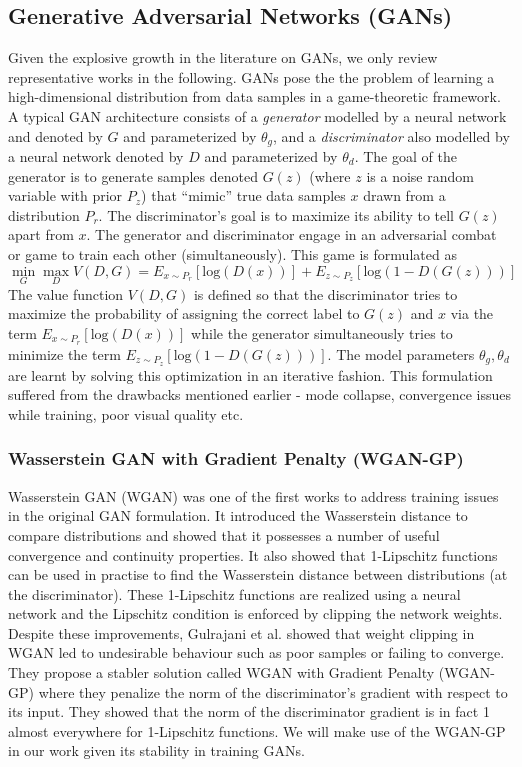 \documentclass{article}
\begin{document}
\subsection{Generative Adversarial Networks (GANs)}
\label{ssec:gans}
Given the explosive growth in the literature on GANs, we only review representative works in the following. GANs \cite{goodfellow2014generative} pose the the problem of learning a high-dimensional distribution from data samples in a game-theoretic framework. A typical GAN architecture consists of a {\em{generator}} modelled by a neural network and denoted by $G$ and parameterized by $\theta_g$, and a {\em{discriminator}} also modelled by a neural network denoted by $D$ and parameterized by $\theta_d$. The goal of the generator is to generate samples denoted $G(z)$ (where $z$ is a noise random variable with prior $P_z$) that ``mimic'' true data samples $x$ drawn from a distribution $P_r$. The discriminator's goal is to maximize its ability to tell $G(z)$ apart from $x$. The generator and discriminator engage in an adversarial combat or game to train each other (simultaneously). This game is formulated as
\begin{equation}
\min_{G}\max_{D} V(D,G) = E_{x\sim P_r}[\text{log}(D(x))] 
+ E_{z\sim P_{z}}[\text{log}(1-D(G(z)))]
\label{eqn:game}
\end{equation}
The value function $V(D, G)$ is defined so that the discriminator tries to maximize the probability of assigning the correct label to $G(z)$ and $x$ via the term $E_{x\sim P_r}[\text{log}(D(x))] $ while the generator simultaneously tries to minimize the term $E_{z\sim P_{z}}[\text{log}(1-D(G(z)))]$. The model parameters $\theta_g, \theta_d$ are learnt by solving this optimization in an iterative fashion. This formulation suffered from the drawbacks mentioned earlier - mode collapse, convergence issues while training, poor visual quality etc.

\subsubsection{Wasserstein GAN with Gradient Penalty (WGAN-GP)}
\label{sssec:wgan_gp}
Wasserstein GAN (WGAN) \cite{arjovsky2017wasserstein} was one of the first works to address training issues in the original GAN formulation. It introduced the Wasserstein distance to compare distributions and showed that it possesses a number of useful convergence and continuity properties. It also showed that 1-Lipschitz functions can be used in practise to find the Wasserstein distance between distributions (at the discriminator). These 1-Lipschitz functions are realized using a neural network and the Lipschitz condition is enforced by clipping the network weights. Despite these improvements, Gulrajani et al. \cite{gulrajani2017improved} showed that weight clipping in WGAN led to undesirable behaviour such as poor samples or failing to converge. They propose a stabler solution called 
WGAN with Gradient Penalty (WGAN-GP) where they penalize the norm of the discriminator's gradient with respect to its input. They showed that the norm of the discriminator gradient is in fact 1 almost everywhere for 1-Lipschitz functions. We will make use of the WGAN-GP in our work given its stability in training GANs.
\end{document}
